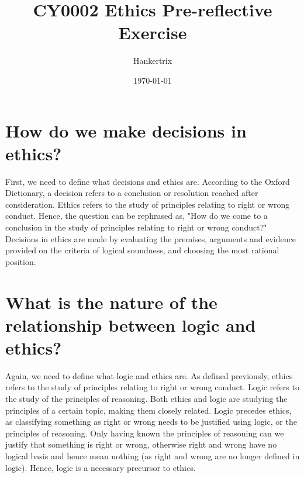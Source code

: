 \documentclass[11pt]{article}
\author{Hankertrix}
\date{\today}
\title{CY0002 Ethics Pre-reflective Exercise}
\begin{document}
\maketitle
\setcounter{tocdepth}{2}
\tableofcontents \clearpage
\section{How do we make decisions in ethics?}
\label{sec:org60735cd}
First, we need to define what decisions and ethics are. According to the Oxford Dictionary, a decision refers to a conclusion or resolution reached after consideration. Ethics refers to the study of principles relating to right or wrong conduct. Hence, the question can be rephrased as, "How do we come to a conclusion in the study of principles relating to right or wrong conduct?" Decisions in ethics are made by evaluating the premises, arguments and evidence provided on the criteria of logical soundness, and choosing the most rational position.

\section{What is the nature of the relationship between logic and ethics?}
\label{sec:orgd11244a}
Again, we need to define what logic and ethics are. As defined previously, ethics refers to the study of principles relating to right or wrong conduct. Logic refers to the study of the principles of reasoning. Both ethics and logic are studying the principles of a certain topic, making them closely related. Logic precedes ethics, as classifying something as right or wrong needs to be justified using logic, or the principles of reasoning. Only having known the principles of reasoning can we justify that something is right or wrong, otherwise right and wrong have no logical basis and hence mean nothing (as right and wrong are no longer defined in logic). Hence, logic is a necessary precursor to ethics.
\end{document}
